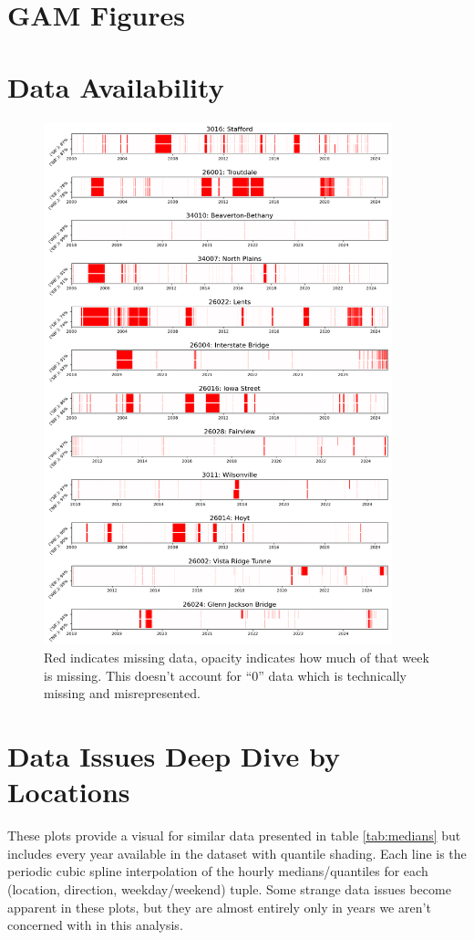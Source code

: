 \documentclass{article}
\begin{document}
\section{GAM Figures}



\section{Data Availability}

\begin{figure}[H] 
    \centering
    \includegraphics[width=0.9\textwidth]{missing_data.png}
    \caption{Red indicates missing data, opacity indicates how much of that week is missing. This doesn't account for ``0'' data which is technically missing and misrepresented.}
    \label{fig:data_availability}
\end{figure}

\section{Data Issues Deep Dive by Locations} \label{app:data_issues}

These plots provide a visual for similar data presented in table \ref{tab:medians} but includes every year available in the dataset with quantile shading. Each line is the periodic cubic spline interpolation of the hourly medians/quantiles for each (location, direction, weekday/weekend) tuple. Some strange data issues become apparent in these plots, but they are almost entirely only in years we aren't concerned with in this analysis.


%
\end{document}
